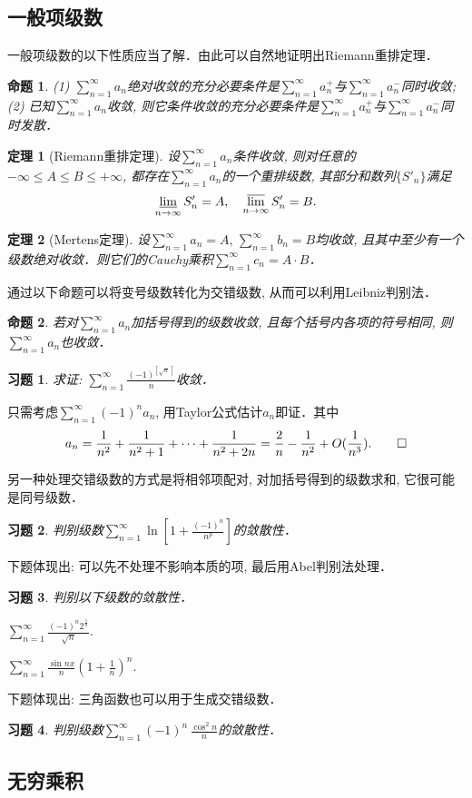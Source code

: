 \documentclass[11pt,a4paper]{ctexart}
\makeatletter
\theoremstyle{thmseries} %
\newtheorem{thm}{定理}[section]
\newtheorem{prop}{命题}[section]
\theoremstyle{exerseries}
\newtheorem{exer}{习题}[section]
\renewenvironment{proof}[1][\proofname]{\par
  \pushQED{\qed}%
  \normalfont \topsep6\p@\@plus6\p@\relax
  \trivlist
  \item[\hskip\labelsep
        \itshape
    #1\@addpunct{}]\ignorespaces
}{%
  \popQED\endtrivlist\@endpefalse
}
\newenvironment{pf}{\begin{proof}[\bfseries\upshape 证\quad]}{\end{proof}}
\newcommand{\bra}[1]{\mathopen{}\left(#1\right)}
\newcommand{\sbra}[1]{\mathopen{}\left[#1\right]}
\def \nti {\mathnormal{n}\to\infty}
\def \series {\sum_{n=1}^{\infty}}
\DeclareMathOperator{\llim}{\underset{\nti}{\underline{\lim}}}
\DeclareMathOperator{\ulim}{\underset{\nti}{\overline{\lim}}}
\makeatother
\begin{document}
\subsection{一般项级数}
一般项级数的以下性质应当了解．由此可以自然地证明出Riemann重排定理．
\begin{prop}
	\textnormal{(1)} $\series a_n$绝对收敛的充分必要条件是$\series a_n^+$与$\series a_n^-$同时收敛;
	\textnormal{(2)} 已知$\series a_n$收敛, 则它条件收敛的充分必要条件是$\series a_n^+$与$\series a_n^-$同时发散．
\end{prop}

\begin{thm}[Riemann重排定理]
	设$\series a_n$条件收敛, 则对任意的$-\infty\leq A\leq B\leq +\infty$, 都存在$\series a_n$的一个重排级数, 其部分和数列$\{S'_n\}$满足
	\[\llim S'_n=A,\quad\ulim S'_n=B.\]
\end{thm}

\begin{thm}[Mertens定理]
	设$\series a_n=A,\,\series b_n=B$均收敛, 且其中至少有一个级数绝对收敛．则它们的Cauchy乘积$\series c_n=A\cdot B$．
\end{thm}

通过以下命题可以将变号级数转化为交错级数, 从而可以利用Leibniz判别法．
\begin{prop}
	若对$\series a_n$加括号得到的级数收敛, 且每个括号内各项的符号相同, 则$\series a_n$也收敛．
\end{prop}

\begin{exer}
	求证: $\series\frac{(-1)^{[\sqrt{n}\,]}}{n}$收敛．
\end{exer}
\begin{pf}
	只需考虑$\series(-1)^na_n$, 用Taylor公式估计$a_n$即证．其中
	\[a_n=\frac{1}{n^2}+\frac{1}{n^2+1}+\cdots+\frac{1}{n^2+2n}=\frac{2}{n}-\frac{1}{n^2}+O(\frac{1}{n^3}).\qedhere\]
\end{pf}

另一种处理交错级数的方式是将相邻项配对, 对加括号得到的级数求和, 它很可能是同号级数．
\begin{exer}
	判别级数$\series\ln\sbra{1+\frac{(-1)^n}{n^p}}$的敛散性．
\end{exer}

下题体现出: 可以先不处理不影响本质的项, 最后用Abel判别法处理．
\begin{exer}
	判别以下级数的敛散性．
	\begin{enumerate}
	\end{enumerate}
\end{exer}

下题体现出: 三角函数也可以用于生成交错级数．
\begin{exer}
	判别级数$\series(-1)^n\,\frac{\cos^2n}{n}$的敛散性．
\end{exer}


\subsection{无穷乘积}
\end{document}
